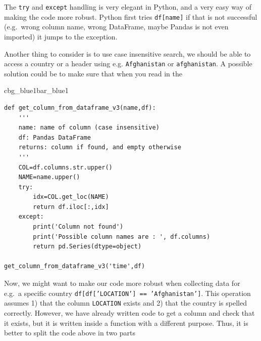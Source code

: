 \documentclass[%
oneside,                 %
final,                   %
10pt]{article}
\newenvironment{_pro_tight}[2]{
   \def\FrameCommand{\color{#2}\vrule width 1mm\normalcolor\colorbox{#1}}
   \FrameRule0.6pt\MakeFramed {\advance\hsize-2mm\FrameRestore}\vskip3mm}
   {\vskip0mm\endMakeFramed}
\newenvironment{pro}[2]{
\bgroup\rmfamily
\fboxsep=0mm\relax
\begin{_pro_tight}{#1}{#2}
\list{}{\parsep=-2mm\parskip=0mm\topsep=0pt\leftmargin=2mm
\rightmargin=2\leftmargin\leftmargin=4pt\relax}
\item\relax}
{\endlist\end{_pro_tight}\egroup}
\begin{document}
The \texttt{try} and \texttt{except} handling is very elegant in Python, and a very easy way of making the code more robust. Python first tries \texttt{df[name]} if that is not successful (e.g.~wrong column name, wrong DataFrame, maybe Pandas is not even imported) it jumps to the exception.

Another thing to consider is to use case insensitive search, we should be able to access a country or a header using e.g. \texttt{Afghanistan} or \texttt{afghanistan}. A possible solution could be to make sure that when you read in the 


















\begin{pro}{cbg_blue1}{bar_blue1}\begin{Verbatim}[numbers=none,fontsize=\fontsize{9pt}{9pt},baselinestretch=0.95,xleftmargin=2mm]
def get_column_from_dataframe_v3(name,df):
    '''
    name: name of column (case insensitive)
    df: Pandas DataFrame
    returns: column if found, and empty otherwise 
    '''
    COL=df.columns.str.upper()
    NAME=name.upper()
    try:
        idx=COL.get_loc(NAME)
        return df.iloc[:,idx]
    except:
        print('Column not found')
        print('Possible column names are : ', df.columns)
        return pd.Series(dtype=object)
        
get_column_from_dataframe_v3('time',df)

\end{Verbatim}
\end{pro}
\noindent

Now, we might want to make our code more robust when collecting data for e.g.~a specific country \texttt{df[df['LOCATION'] == 'Afghanistan']}. This operation assumes 1) that the column \texttt{LOCATION} exists and 2) that the country is spelled correctly. However, we have already written code to get a column and check that it exists, but it is written inside a function with a different purpose. Thus, it is better to split the code above in two parts
\end{document}

